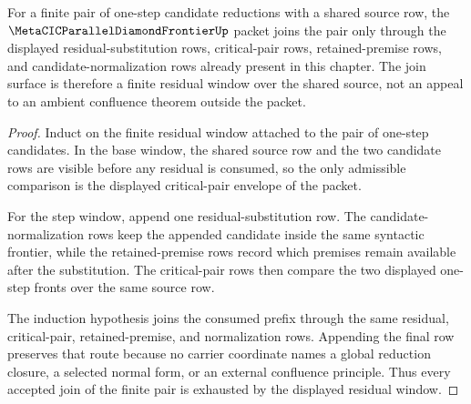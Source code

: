 \begin{theorem}\label{thm:metacic-parallel-reduction-window}
For a finite pair of one-step candidate reductions with a shared source row, the $\MetaCICParallelDiamondFrontierUp$ packet joins the pair only through the displayed residual-substitution rows, critical-pair rows, retained-premise rows, and candidate-normalization rows already present in this chapter. The join surface is therefore a finite residual window over the shared source, not an appeal to an ambient confluence theorem outside the packet.
\end{theorem}
\begin{proof}
Induct on the finite residual window attached to the pair of one-step candidates. In the base window, the shared source row and the two candidate rows are visible before any residual is consumed, so the only admissible comparison is the displayed critical-pair envelope of the packet.

For the step window, append one residual-substitution row. The candidate-normalization rows keep the appended candidate inside the same syntactic frontier, while the retained-premise rows record which premises remain available after the substitution. The critical-pair rows then compare the two displayed one-step fronts over the same source row.

The induction hypothesis joins the consumed prefix through the same residual, critical-pair, retained-premise, and normalization rows. Appending the final row preserves that route because no carrier coordinate names a global reduction closure, a selected normal form, or an external confluence principle. Thus every accepted join of the finite pair is exhausted by the displayed residual window.
\end{proof}
